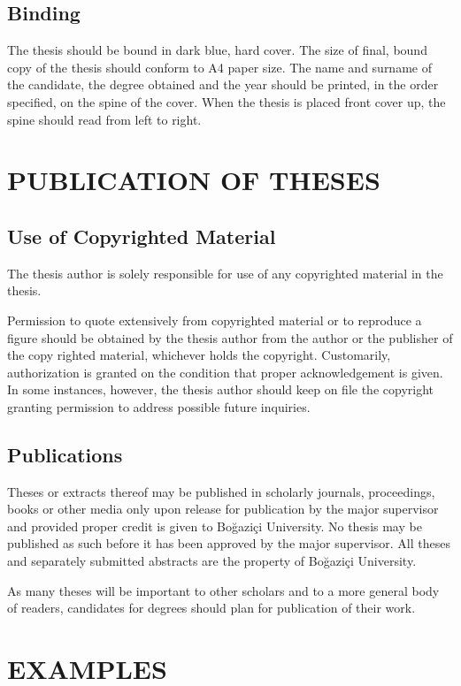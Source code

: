 \documentclass[a4paper,oneside,12pt]{report}
\numberwithin{equation}{chapter}
\begin{document}
\section{Binding}
The thesis should be bound in dark blue, hard cover. The size of final, bound
copy of the thesis should conform to A4 paper size. The name and surname of
the candidate, the degree obtained and the year should be
printed, in the order specified, on the spine of the cover. When the thesis
is placed front cover up, the spine should read from left to right.



\chapter{PUBLICATION OF THESES}


\section{Use of Copyrighted Material}
The thesis author is solely responsible for use of any
copyrighted material in the thesis. 

Permission to quote extensively from copyrighted material or to
reproduce a figure should be obtained by the thesis author from the author 
or the publisher of the copy righted material, whichever holds the copyright. Customarily,
authorization is granted on the condition that proper acknowledgement
is given. In some instances, however, the thesis author should keep on file the copyright granting permission to address possible future inquiries.


\section{Publications}
Theses or extracts thereof may be published in scholarly journals, proceedings, books or other media only upon release for publication by the major supervisor and provided proper credit is
given to Bo\u{g}azi\c{c}i University. No thesis may be published as
such before it has been approved by the major supervisor. All theses
and separately submitted abstracts are the property of Bo\u{g}azi\c{c}i
University.

As many theses will be important to other scholars and to a more
general body of readers, candidates for degrees should plan for
publication of their work. 




\chapter{EXAMPLES}
\label{chapter:experiments-and-results}
\end{document}
